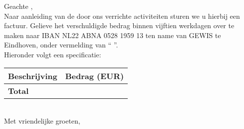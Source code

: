 \documentclass[
 digital,         %
]{GEWISLetter}
\newcommand{\GEWIScontact}{%
\\%
}
\begin{document}
\GEWISfirstpage                 %
\printadresenkenmerk            %


Geachte %
,\\[2\baselineskip]
Naar aanleiding van de door ons verrichte activiteiten sturen we u hierbij een factuur. Gelieve het verschuldigde bedrag binnen vijftien werkdagen over te maken naar IBAN NL22 ABNA 0528 1959 13 ten name van GEWIS te Eindhoven, onder vermelding van ``%
''.\\[\baselineskip]
Hieronder volgt een specificatie:\\[\baselineskip]
\begin{tabularx}{\textwidth}{X r}\toprule
Beschrijving & Bedrag (EUR)\\\midrule
\cmidrule{2-2} \textbf{Total} & {\bfseries %
}\\\bottomrule
\end{tabularx}
\\[2\baselineskip]
Met vriendelijke groeten,\\[2\baselineskip]
\GEWIScontact
\end{document}
